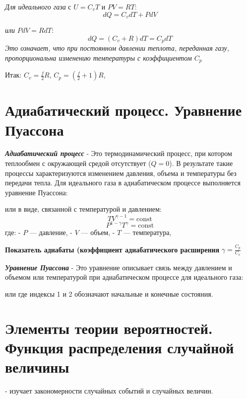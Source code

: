\documentclass[14pt]{article}
\begin{document}
\textit{Для идеального газа} 
с \(U = C_v T\) и \(PV = RT\):
\[dQ = C_v dT + P dV\]

\textit{или} \(P dV = R dT\):
\[dQ = (C_v + R) dT = C_p dT\]
\newline \textit{Это означает, что при постоянном давлении теплота, переданная газу, пропорциональна изменению температуры с коэффициентом \( C_p \)}

Итак:  
\( C_v = \frac{f}{2} R \),
\( C_p = \left( \frac{f}{2} + 1 \right) R \),


    
\section{Адиабатический процесс. Уравнение Пуассона}
\textbf{\textit{Адиабатический процесс}} - Это термодинамический процесс, при котором теплообмен с окружающей средой отсутствует (\(Q=0\)). 
\newline В результате такие процессы характеризуются изменением давления, объема и температуры без передачи тепла.
\newline Для идеального газа в адиабатическом процессе выполняется уравнение Пуассона: 
\begin{center}
    \big[\[ PV^{\gamma} = \text{const} \]\big]
    или в виде, связанной с температурой и давлением:
    \[ TV^{\gamma - 1} = \text{const} \] \[ P^{1-\gamma} T^{\gamma} = \text{const} \]
    где: - \(P\) — давление, - \(V\) — объем, - \(T\) — температура, 
\end{center}
\textbf{Показатель адиабаты (коэффициент адиабатического расширения} 
\(\gamma = \frac{C_p}{C_v}\) 

\textbf{\textit{Уравнение Пуассона}} - Это уравнение описывает связь между давлением и объемом или температурой при адиабатическом процессе для идеального газа:
\begin{center}
    
    или
    \big[\[ \frac{P_1 V_1^{\gamma}}{P_2 V_2^{\gamma}} = 1 \]\big]
    где индексы 1 и 2 обозначают начальные и конечные состояния.
\end{center}



\section{Элементы теории вероятностей. Функция распределения случайной величины}
- изучает закономерности случайных событий и случайных величин. 
\end{document}
